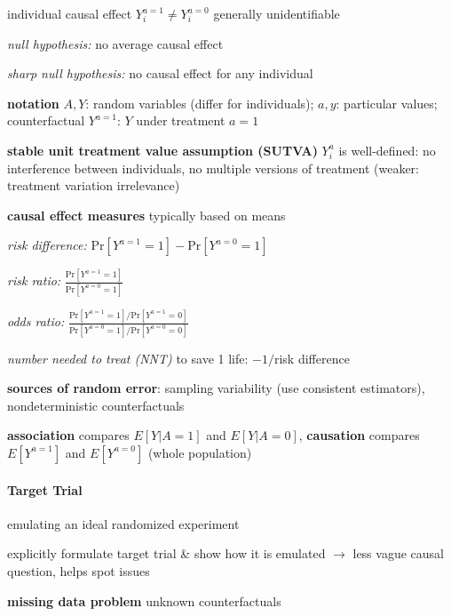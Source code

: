 \documentclass[8pt,oneside]{extarticle}
\begin{document}
\begin{multicols}{2}
\noindent individual causal effect $Y_i^{a=1} \neq Y_i^{a=0}$ generally unidentifiable

\noindent \textit{null hypothesis:} no average causal effect

\noindent \textit{sharp null hypothesis:} no causal effect for any individual

\noindent \textbf{notation} $A,Y$: random variables (differ for individuals);
$a,y$: particular values; counterfactual $Y^{a=1}$: $Y$ under treatment $a=1$

\noindent  \textbf{stable unit treatment value assumption (SUTVA)} $Y_i^a$ is well-defined: no interference between individuals, no multiple versions of treatment (weaker: treatment variation irrelevance)

\noindent  \textbf{causal effect measures} typically based on means

\textit{risk difference:}  $\mathrm{Pr}\left[Y^{a=1}=1\right] - \mathrm{Pr}\left[Y^{a=0}=1\right]$

\textit{risk ratio:} $\frac{\mathrm{Pr}\left[Y^{a=1}=1\right]}{ \mathrm{Pr}\left[Y^{a=0}=1\right]}$

\textit{odds ratio:} $\frac{\mathrm{Pr}\left[Y^{a=1}=1\right]/\mathrm{Pr}\left[Y^{a=1}=0\right]}{ \mathrm{Pr}\left[Y^{a=0}=1\right]/\mathrm{Pr}\left[Y^{a=0}=0\right]}$

\noindent \textit{number needed to treat (NNT)} to save 1 life: $-1/$risk difference

\noindent \textbf{sources of random error}: sampling variability (use consistent estimators), nondeterministic counterfactuals

\noindent\textbf{association} compares $E\left[Y|A=1\right]$ and $E\left[Y|A=0\right]$, \textbf{causation} compares $E\left[Y^{a=1}\right]$ and $E\left[Y^{a=0}\right]$ (whole population)









\paragraph{\large Target Trial} emulating an ideal randomized experiment

\noindent explicitly formulate target trial \& show how it is emulated $\rightarrow$ \newline less vague causal question, helps spot issues

\noindent \textbf{missing data problem} unknown counterfactuals


\end{multicols}
\end{document}
